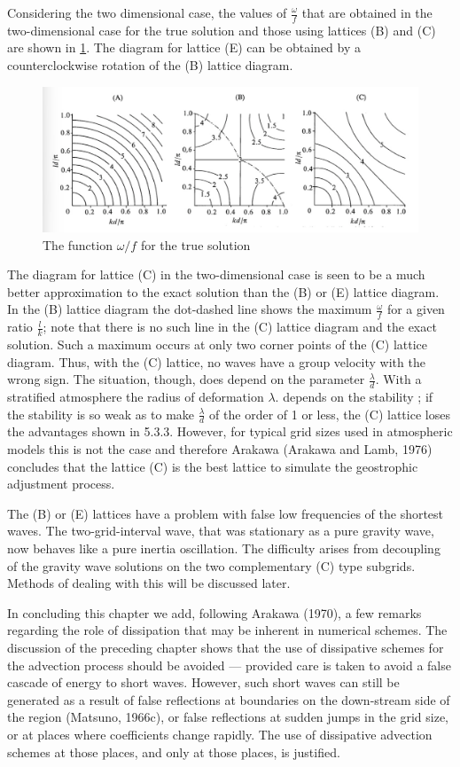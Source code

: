 Considering the two dimensional case, the values of $\frac{\omega}{f}$ that are obtained in the two-dimensional case for the true solution and those using lattices (B) and (C) are shown in \ref{fig:5.3.3}. The diagram for lattice (E) can be obtained by a counterclockwise rotation of the (B) lattice diagram.
\begin{figure}[h]
	\centering
	\includegraphics[width=0.5\linewidth]{uploads/Screenshot 2024-11-14 124824.png}
	\caption{The function $\omega/f$ for the true solution}
	\label{fig:5.3.3}
\end{figure}
The diagram for lattice (C) in the two-dimensional case is seen to be a much better approximation to the exact solution than the (B) or (E) lattice diagram. In the (B) lattice diagram the dot-dashed line shows the maximum $\frac{\omega}{f}$ for a given ratio $\frac{l}{k}$; note that there is no such line in the (C) lattice diagram and the exact solution. Such a maximum occurs at only two corner points of the (C) lattice diagram. Thus, with the (C) lattice, no waves have a group velocity with the wrong sign. The situation, though, does depend on the parameter $\frac{\lambda}{d}$. With a stratified atmosphere the radius of deformation $\lambda$. depends on the stability ; if the stability is so weak as to make $\frac{\lambda}{d}$ of the order of 1 or less, the (C) lattice loses the advantages shown in 5.3.3. However, for typical grid sizes used in atmospheric models this is not the case and therefore Arakawa (Arakawa and Lamb, 1976) concludes that the lattice (C) is the best lattice to simulate the geostrophic adjustment process.

The (B) or (E) lattices have a problem with false low frequencies of the shortest waves. The two-grid-interval wave, that was stationary as a pure gravity wave, now behaves like a pure inertia oscillation. The difficulty arises from decoupling of the gravity wave solutions on the two complementary (C) type subgrids. Methods of dealing with this will be discussed later.

In concluding this chapter we add, following Arakawa (1970), a few remarks regarding the role of dissipation that may be inherent in numerical schemes. The discussion of the preceding chapter shows that the use of dissipative schemes for the advection process should be avoided — provided care is taken to avoid a false cascade of energy to short waves. However, such short waves can still be generated as a result of false reflections at boundaries on the down-stream side of the region (Matsuno, 1966c), or false reflections at sudden jumps in the grid size, or at places where coefficients change rapidly. The use of dissipative advection schemes at those places, and only at those places, is justified.

